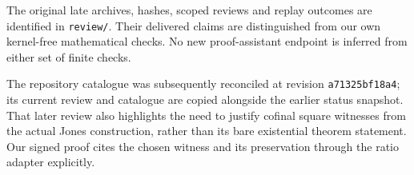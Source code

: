 The original late archives, hashes, scoped reviews and replay outcomes are
identified in \texttt{review/}. Their delivered claims are distinguished from
our own kernel-free mathematical checks. No new proof-assistant endpoint is
inferred from either set of finite checks.

The repository catalogue was subsequently reconciled at revision
\texttt{a71325bf18a4}; its current review and catalogue are copied alongside
the earlier status snapshot. That later review also highlights the need to
justify cofinal square witnesses from the actual Jones construction, rather
than its bare existential theorem statement. Our signed proof cites the
chosen witness and its preservation through the ratio adapter explicitly.
